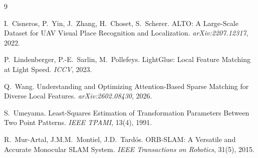\documentclass[11pt,a4paper]{article}
\begin{document}
\begin{thebibliography}{9}

I.~Cisneros, P.~Yin, J.~Zhang, H.~Choset, S.~Scherer.
\newblock ALTO: A Large-Scale Dataset for UAV Visual Place Recognition and
  Localization.
\newblock \emph{arXiv:2207.12317}, 2022.

P.~Lindenberger, P.-E.~Sarlin, M.~Pollefeys.
\newblock LightGlue: Local Feature Matching at Light Speed.
\newblock \emph{ICCV}, 2023.

Q.~Wang.
\newblock Understanding and Optimizing Attention-Based Sparse Matching for
  Diverse Local Features.
\newblock \emph{arXiv:2602.08430}, 2026.

S.~Umeyama.
\newblock Least-Squares Estimation of Transformation Parameters Between Two
  Point Patterns.
\newblock \emph{IEEE TPAMI}, 13(4), 1991.

R.~Mur-Artal, J.M.M.~Montiel, J.D.~Tard\'{o}s.
\newblock ORB-SLAM: A Versatile and Accurate Monocular SLAM System.
\newblock \emph{IEEE Transactions on Robotics}, 31(5), 2015.

\end{thebibliography}
\end{document}
